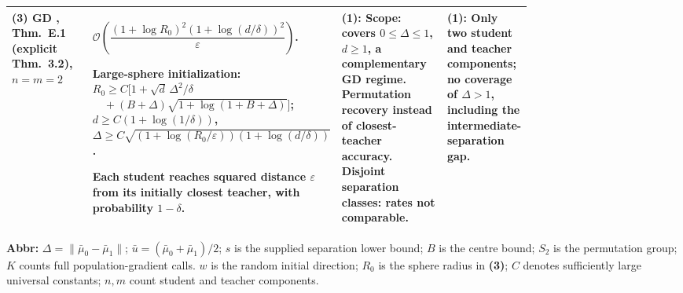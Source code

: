 \begin{table}[tp]
\begin{threeparttable}
\begin{tabularx}{\linewidth}{@{}>{\raggedright\arraybackslash}p{0.20\linewidth}>{\raggedright\arraybackslash}p{0.32\linewidth}>{\raggedright\arraybackslash}p{0.25\linewidth}>{\raggedright\arraybackslash}X@{}}
\midrule
\textbf{(3)} GD \citep{srfTyurin2026v1}, Thm.~E.1 (explicit Thm.~3.2), $n=m=2$
& $\mathcal{O}\!\left(\dfrac{(1+\log R_0)^2(1+\log(d/\delta))^2}{\varepsilon}\right)$.
\par Large-sphere initialization:
$R_0\ge C\bigl[1+\sqrt d\,\Delta^2/\delta$
$\quad +(B+\Delta)\sqrt{1+\log(1+B+\Delta)}\bigr]$;
$d\ge C(1+\log(1/\delta))$,
$\Delta\ge C\sqrt{(1+\log(R_0/\varepsilon))(1+\log(d/\delta))}$.\par Each student reaches squared distance $\varepsilon$ from its initially closest teacher, with probability $1-\delta$.
& \textbf{(1)}: Scope: covers $0\le\Delta\le1$, $d\ge1$, a complementary GD regime. Permutation recovery instead of closest-teacher accuracy. Disjoint separation classes: rates not comparable.
& \textbf{(1)}: Only two student and teacher components; no coverage of $\Delta>1$, including the intermediate-separation gap. \\
\bottomrule
\end{tabularx}
\begin{tablenotes}[flushleft]\footnotesize
\item[] \textbf{Abbr:} $\Delta=\|\bar\mu_0-\bar\mu_1\|$; $\bar u=(\bar\mu_0+\bar\mu_1)/2$; $s$ is the supplied separation lower bound; $B$ is the centre bound; $S_2$ is the permutation group; $K$ counts full population-gradient calls. $w$ is the random initial direction; $R_0$ is the sphere radius in \textbf{(3)}; $C$ denotes sufficiently large universal constants; $n,m$ count student and teacher components.
\end{tablenotes}
\end{threeparttable}
\end{table}
\clearpage
